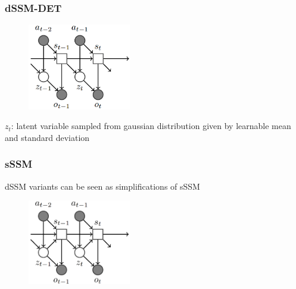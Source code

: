 \begin{frame}
	\frametitle{dSSM-DET}
	\begin{multicols}{2}
		\begin{figure}[h]
			\includegraphics[width=0.4\textwidth]{./latent_i2a_images/dSSM_VAE_architecture.png}	
		\end{figure}
		\columnbreak
		$z_t$: latent variable sampled from gaussian distribution given by learnable mean and standard deviation
	\end{multicols}
\end{frame}


\begin{frame}
	\frametitle{sSSM}
	dSSM variants can be seen as simplifications of sSSM \\
	\begin{multicols}{2}
		\begin{figure}[h]
			\includegraphics[width=0.4\textwidth]{./latent_i2a_images/sSSM2.png}	
		\end{figure}
		\columnbreak
	\end{multicols}
\end{frame}


